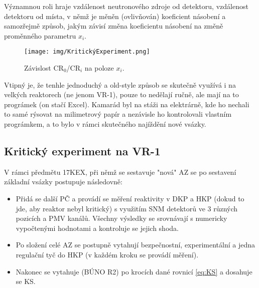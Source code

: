 Významnou roli hraje vzdálenost neutronového zdroje od detektoru, vzdálenost detektoru od místa, v němž je měněn (ovlivňován) koeficient násobení
a samozřejmě způsob, jakým závisí změna koeficientu násobení na změně proměnného
parametru $x_i$.

\begin{figure}[H] 
    \centering
    \texttt{[image: img/KritickýExperiment.png]}
    \caption{Závislost CR$_0$/CR$_i$ na poloze $x_i$.}
    \label{SNM}
\end{figure}

Vtipný je, že tenhle jednoduchý a old-style způsob se skutečně využívá i na velkých reaktorech (ne jenom VR-1), pouze to nedělají ručně, ale mají na to prográmek (on stačí Excel). Kamarád byl na stáži na elektrárně, kde ho nechali to samé rýsovat na milimetrový papír a nezávisle ho kontrolovali vlastním prográmkem, a to bylo v rámci skutečného najíždění nové vsázky.

\subsection{Kritický experiment na VR-1}
V rámci předmětu 17KEX, při němž se sestavuje "nová" AZ se po sestavení základní vsázky postupuje následovně:
\begin{itemize}
    \item Přidá se další PČ a provádí se měření reaktivity v DKP a HKP (dokud to jde, aby reaktor nebyl kritický) s využitím SNM detektorů ve 3 různých pozicích a PMV kanálů. Všechny výsledky se srovnávají s numericky vypočtenými hodnotami a kontroluje se jejich shoda. 
    \item Po složení celé AZ se postupně vytahují bezpečnostní, experimentální a jedna regulační tyč do HKP (v každém kroku se provádí měření).
    \item Nakonec se vytahuje (BÚNO R2) po krocích dané rovnicí \eqref{eq:KS} a dosahuje se KS.
\end{itemize}
